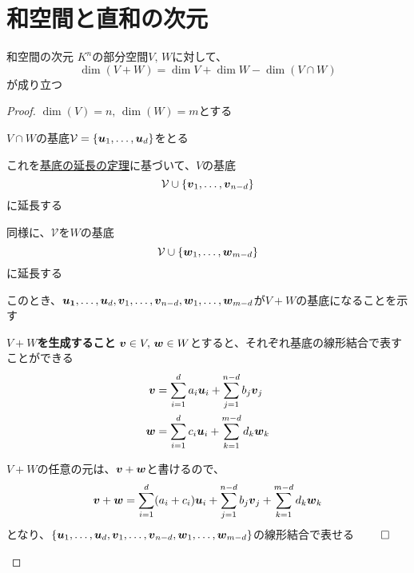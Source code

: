 \documentclass[../../../topic_linear-algebra]{subfiles}
\begin{document}
\sectionline
\section{和空間と直和の次元}

\begin{theorem*}{和空間の次元}
  $K^n$の部分空間$V, \, W$に対して、
  \begin{equation*}
    \dim(V + W) = \dim V + \dim W - \dim(V \cap W)
  \end{equation*}
  が成り立つ
\end{theorem*}

\begin{proof}
  $\dim(V) = n, \, \dim(W) = m$とする

  \br

  $V \cap W$の基底$\mathcal{V} = \{ \vb*{u}_1,\dots, \vb*{u}_d \}$をとる

  これを\hyperref[thm:basis-extension]{基底の延長の定理}に基づいて、$V$の基底
  \begin{equation*}
    \mathcal{V} \cup \{ \vb*{v}_1, \dots, \vb*{v}_{n-d} \}
  \end{equation*}
  に延長する

  同様に、$\mathcal{V}$を$W$の基底
  \begin{equation*}
    \mathcal{V} \cup \{ \vb*{w}_1, \dots, \vb*{w}_{m-d} \}
  \end{equation*}
  に延長する

  \br

  このとき、$\vb*{u_1}, \dots, \vb*{u}_d, \vb*{v}_1, \dots, \vb*{v}_{n-d}, \vb*{w}_1, \dots, \vb*{w}_{m-d}$が$V + W$の基底になることを示す

  \begin{subpattern}{\bfseries $V+W$を生成すること}
    $\vb*{v} \in V, \, \vb*{w} \in W$とすると、それぞれ基底の線形結合で表すことができる
    \begin{align*}
      \vb*{v} & = \sum_{i=1}^d a_i \vb*{u}_i + \sum_{j=1}^{n-d} b_j \vb*{v}_j \\
      \vb*{w} & = \sum_{i=1}^d c_i \vb*{u}_i + \sum_{k=1}^{m-d} d_k \vb*{w}_k
    \end{align*}

    \br

    $V+W$の任意の元は、$\vb*{v} + \vb*{w}$と書けるので、
    \begin{equation*}
      \vb*{v} + \vb*{w} = \sum_{i=1}^d (a_i + c_i) \vb*{u}_i + \sum_{j=1}^{n-d} b_j \vb*{v}_j + \sum_{k=1}^{m-d} d_k \vb*{w}_k
    \end{equation*}
    となり、$\{ \vb*{u}_1, \dots, \vb*{u}_d, \vb*{v}_1, \dots, \vb*{v}_{n-d}, \vb*{w}_1, \dots, \vb*{w}_{m-d} \}$の線形結合で表せる $\qed$
  \end{subpattern}


\end{proof}
\end{document}
